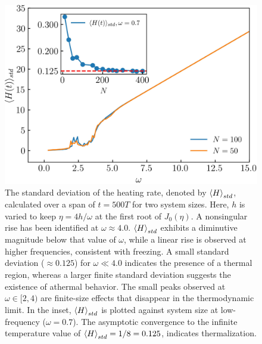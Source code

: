 \documentclass[%
reprint,
superscriptaddress,
amsmath,amssymb,
aps,
prb,
showkeys,
]{revtex4-2}
\begin{document}
	\begin{figure}[!ht]
		\centering
		\includegraphics[width = 8.cm]{hbar_avg_std.jpeg}
		\caption{The standard deviation of the heating rate, denoted by $\expval{H}_{std}$, calculated over a span of $t=500 T$ for two system sizes. Here, $h$ is varied to keep $\eta = 4h/\omega$ at the first root of $J_0(\eta)$. A nonsingular rise has been identified at $\omega \approx 4.0$. $\expval{H}_{std}$ exhibits a diminutive magnitude below that value of $\omega$, while a linear rise is observed at higher frequencies, consistent with freezing. A small standard deviation ($\approx 0.125$) for $\omega \ll 4.0$ indicates the presence of a thermal region, whereas a larger finite standard deviation suggests the existence of athermal behavior. The small peaks observed at $\omega\in [2, 4)$ are finite-size effects that disappear in the thermodynamic limit. In the inset, $\expval{H}_{std}$ is plotted against system size at low-frequency ($\omega=0.7$).   The asymptotic convergence to the infinite temperature value of $\expval{H}_{std} = 1/8 = 0.125$, indicates thermalization.}
		\label{fig:havg_std}
	\end{figure}
	
\end{document}
